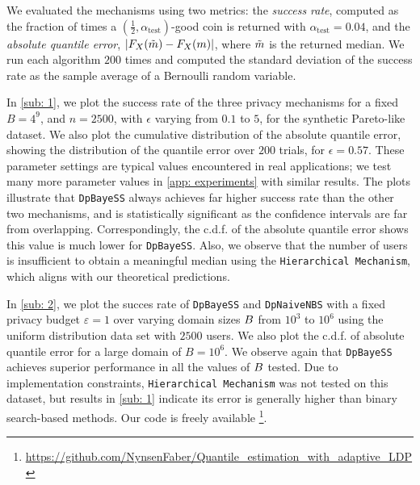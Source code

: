 We evaluated the mechanisms using two metrics: the \emph{success rate}, 
%
computed as the fraction of times a $(\frac{1}{2}, \alpha_{\text{test}})$-good coin is returned with $\alpha_{\text{test}}=0.04$, and the \emph{absolute quantile error}, $|F_X(\Tilde{m}) - F_X(m)|$, where $\Tilde{m}$ is the returned median. We run each algorithm $200$ times and computed the standard deviation of the success rate as the sample average of a Bernoulli random variable.
%

In \autoref{sub: 1}, we plot the success rate of the three privacy mechanisms for a fixed $B=4^9$, and $n = 2500$, with $\epsilon$ varying from $0.1$ to $5$, for the synthetic Pareto-like dataset. We also plot the cumulative distribution of the absolute quantile error, showing the distribution of the quantile error over $200$ trials, for $\epsilon = 0.57$. These parameter settings are typical values encountered in real applications; we test many more parameter values in \autoref{app: experiments} with similar results. 
%
The plots illustrate that \texttt{DpBayeSS} always achieves far higher success rate than the other two mechanisms, and is statistically significant as the confidence intervals are far from overlapping. Correspondingly, the c.d.f. of the absolute quantile error shows this value is much lower for \texttt{DpBayeSS}. Also, we observe that the number of users is insufficient to obtain a meaningful median using the \texttt{Hierarchical Mechanism}, which aligns with our theoretical predictions.

In \autoref{sub: 2}, we plot the succes rate of \texttt{DpBayeSS} and \texttt{DpNaiveNBS} with a fixed privacy budget $\varepsilon=1$ over varying domain sizes $B$ from $10^3$ to $10^6$ using the uniform distribution data set with $2500$ users. We also plot the c.d.f. of absolute quantile error for a large domain of $B = 10^6$. We observe again that \texttt{DpBayeSS} achieves superior performance in all the values of $B$ tested. Due to implementation constraints, \texttt{Hierarchical Mechanism} was not tested on this dataset, but results in \autoref{sub: 1} indicate its error is generally higher than binary search-based methods. Our code is freely available \footnote{\url{https://github.com/NynsenFaber/Quantile_estimation_with_adaptive_LDP}}.





